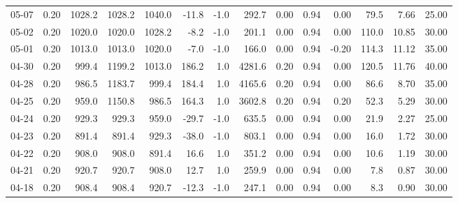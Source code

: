 \begin{threeparttable}
{\begin{tabular}{lrrrrrrrrrrrrr}
  05-07 &     0.20 & 1028.2 & 1028.2 & 1040.0 &      -11.8 &                     -1.0 &               292.7 &       0.00 &      0.94 &           0.00 &             79.5 &            7.66 &                  25.00 \\
  05-02 &     0.20 & 1020.0 & 1020.0 & 1028.2 &       -8.2 &                     -1.0 &               201.1 &       0.00 &      0.94 &           0.00 &            110.0 &           10.85 &                  30.00 \\
  05-01 &     0.20 & 1013.0 & 1013.0 & 1020.0 &       -7.0 &                     -1.0 &               166.0 &       0.00 &      0.94 &          -0.20 &            114.3 &           11.12 &                  35.00 \\
  04-30 &     0.20 &  999.4 & 1199.2 & 1013.0 &      186.2 &                      1.0 &              4281.6 &       0.20 &      0.94 &           0.00 &            120.5 &           11.76 &                  40.00 \\
  04-28 &     0.20 &  986.5 & 1183.7 &  999.4 &      184.4 &                      1.0 &              4165.6 &       0.20 &      0.94 &           0.00 &             86.6 &            8.70 &                  35.00 \\
  04-25 &     0.20 &  959.0 & 1150.8 &  986.5 &      164.3 &                      1.0 &              3602.8 &       0.20 &      0.94 &           0.20 &             52.3 &            5.29 &                  30.00 \\
  04-24 &     0.20 &  929.3 &  929.3 &  959.0 &      -29.7 &                     -1.0 &               635.5 &       0.00 &      0.94 &           0.00 &             21.9 &            2.27 &                  25.00 \\
  04-23 &     0.20 &  891.4 &  891.4 &  929.3 &      -38.0 &                     -1.0 &               803.1 &       0.00 &      0.94 &           0.00 &             16.0 &            1.72 &                  30.00 \\
  04-22 &     0.20 &  908.0 &  908.0 &  891.4 &       16.6 &                      1.0 &               351.2 &       0.00 &      0.94 &           0.00 &             10.6 &            1.19 &                  30.00 \\
  04-21 &     0.20 &  920.7 &  920.7 &  908.0 &       12.7 &                      1.0 &               259.9 &       0.00 &      0.94 &           0.00 &              7.8 &            0.87 &                  30.00 \\
  04-18 &     0.20 &  908.4 &  908.4 &  920.7 &      -12.3 &                     -1.0 &               247.1 &       0.00 &      0.94 &           0.00 &              8.3 &            0.90 &                  30.00 \\

\end{tabular}}
\end{threeparttable}
